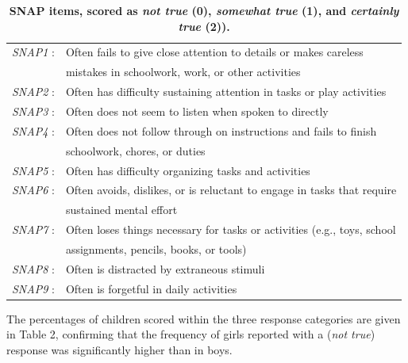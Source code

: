 \documentclass[10pt,letterpaper]{article}
\begin{document}
\begin{table}[!ht]
\begin{adjustwidth}{-5mm}{0in} %
\centering
\caption{\bf SNAP items, scored as \emph{not true} (0), \emph{somewhat true} (1), and \emph{certainly true} (2)).}
\vspace{5mm}
\begin{tabular}{|ll|}
\hline
{\it SNAP1} : & Often fails to give close attention to details or makes careless\\ & mistakes in schoolwork, work, or other activities\\ \hline
{\it SNAP2} : & Often has difficulty sustaining attention in tasks or play activities \\ \hline
{\it SNAP3} : & Often does not seem to listen when spoken to directly \\ \hline
{\it SNAP4} : & Often does not follow through on instructions and fails to finish\\ &  schoolwork, chores, or duties\\ \hline
{\it SNAP5} : & Often has difficulty organizing tasks and activities \\ \hline
{\it SNAP6} : & Often avoids, dislikes, or is reluctant to engage in tasks that require\\ & sustained mental effort\\ \hline
{\it SNAP7} : & Often loses things necessary for tasks or activities (e.g., toys, school\\ &  assignments, pencils, books, or tools) \\ \hline
{\it SNAP8} : & Often is distracted by extraneous stimuli\\ \hline
{\it SNAP9} : & Often is forgetful in daily activities \\ \hline
\end{tabular}
\label{Table1}
\end{adjustwidth}
\end{table}



The percentages of children scored within the three response categories are given in Table 2, confirming that the  frequency of girls reported with a (\emph{not true}) response was significantly higher than in boys. \\

\vspace{5mm}
\end{document}
